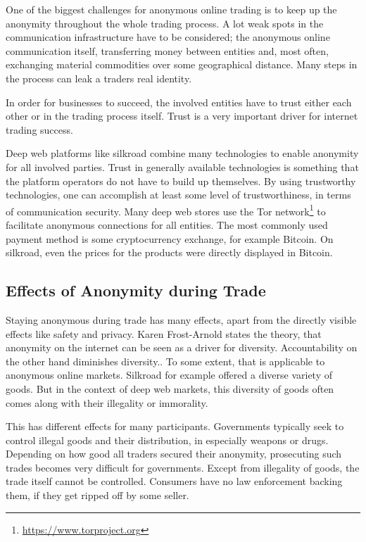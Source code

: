 One of the biggest challenges for anonymous online trading is to keep up the anonymity throughout the whole trading process. A lot weak spots in the communication infrastructure have to be considered; the anonymous online communication itself, transferring money between entities and, most often, exchanging material commodities over some geographical distance. Many steps in the process can leak a traders real identity.

In order for businesses to succeed, the involved entities have to trust either each other or in the trading process itself. Trust is a very important driver for internet trading success\cite{internetTrust2004}.

Deep web platforms like silkroad\cite{silkroad2013} combine many technologies to enable anonymity for all involved parties. Trust in generally available technologies is something that the platform operators do not have to build up themselves. By using trustworthy technologies, one can accomplish at least some level of trustworthiness, in terms of communication security. Many deep web stores use the Tor network\footnote{\url{https://www.torproject.org}} to facilitate anonymous connections for all entities\cite{silkroad2013}. The most commonly used payment method is some cryptocurrency exchange, for example Bitcoin. On silkroad, even the prices for the products were directly displayed in Bitcoin\cite{silkroad2013}.

\subsection{Effects of Anonymity during Trade}

Staying anonymous during trade has many effects, apart from the directly visible effects like safety and privacy. Karen Frost-Arnold states the theory, that anonymity on the internet can be seen as a driver for diversity. Accountability on the other hand diminishes diversity.\cite{accountability2014}. To some extent, that is applicable to anonymous online markets. Silkroad for example offered a diverse variety of goods. But in the context of deep web markets, this diversity of goods often comes along with their illegality or immorality\cite{silkroad2013}.

This has different effects for many participants. Governments typically seek to control illegal goods and their distribution, in especially weapons or drugs. Depending on how good all traders secured their anonymity, prosecuting such trades becomes very difficult for governments. Except from illegality of goods, the trade itself cannot be controlled. Consumers have no law enforcement backing them, if they get ripped off by some seller.

